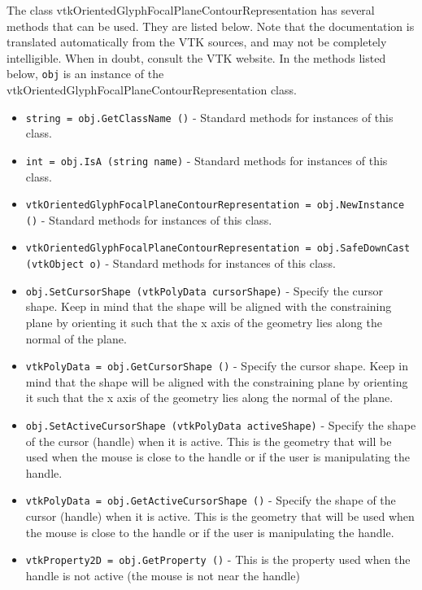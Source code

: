 The class vtkOrientedGlyphFocalPlaneContourRepresentation has several methods that can be used.
  They are listed below.
Note that the documentation is translated automatically from the VTK sources,
and may not be completely intelligible.  When in doubt, consult the VTK website.
In the methods listed below, \verb|obj| is an instance of the vtkOrientedGlyphFocalPlaneContourRepresentation class.
\begin{itemize}
\item  \verb|string = obj.GetClassName ()| -  Standard methods for instances of this class.

\item  \verb|int = obj.IsA (string name)| -  Standard methods for instances of this class.

\item  \verb|vtkOrientedGlyphFocalPlaneContourRepresentation = obj.NewInstance ()| -  Standard methods for instances of this class.

\item  \verb|vtkOrientedGlyphFocalPlaneContourRepresentation = obj.SafeDownCast (vtkObject o)| -  Standard methods for instances of this class.

\item  \verb|obj.SetCursorShape (vtkPolyData cursorShape)| -  Specify the cursor shape. Keep in mind that the shape will be
 aligned with the  constraining plane by orienting it such that
 the x axis of the geometry lies along the normal of the plane.

\item  \verb|vtkPolyData = obj.GetCursorShape ()| -  Specify the cursor shape. Keep in mind that the shape will be
 aligned with the  constraining plane by orienting it such that
 the x axis of the geometry lies along the normal of the plane.

\item  \verb|obj.SetActiveCursorShape (vtkPolyData activeShape)| -  Specify the shape of the cursor (handle) when it is active.
 This is the geometry that will be used when the mouse is
 close to the handle or if the user is manipulating the handle.

\item  \verb|vtkPolyData = obj.GetActiveCursorShape ()| -  Specify the shape of the cursor (handle) when it is active.
 This is the geometry that will be used when the mouse is
 close to the handle or if the user is manipulating the handle.

\item  \verb|vtkProperty2D = obj.GetProperty ()| -  This is the property used when the handle is not active 
 (the mouse is not near the handle)


\end{itemize}
